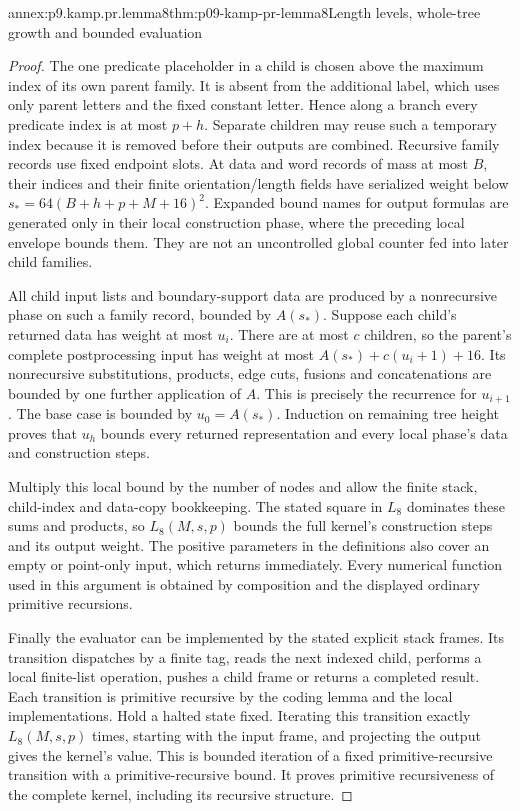 \begin{annexitem}{annex:p9.kamp.pr.lemma8}{thm:p09-kamp-pr-lemma8}{Length levels, whole-tree growth and bounded evaluation}
\begin{proof}
The one predicate placeholder in a child is chosen above the
maximum index of its own parent family. It is absent from the
additional label, which uses only parent letters and the fixed
constant letter. Hence along a branch every predicate index is
at most \(p+h\). Separate children may reuse such a temporary
index because it is removed before their outputs are combined.
Recursive family records use fixed endpoint slots. At data and
word records of mass at most \(B\), their indices and their
finite orientation/length fields have serialized weight below
\(s_*=64(B+h+p+M+16)^2\). Expanded bound names for output
formulas are generated only in their local construction phase,
where the preceding local envelope bounds them. They are not
an uncontrolled global counter fed into later child families.

All child input lists and boundary-support data are produced by
a nonrecursive phase on such a family record, bounded by
\(A(s_*)\). Suppose each child's returned data has weight
at most \(u_i\). There are at most \(c\) children, so
the parent's complete postprocessing input has weight at most
\(A(s_*)+c(u_i+1)+16\). Its nonrecursive substitutions,
products, edge cuts, fusions and concatenations are bounded by
one further application of \(A\). This is precisely the
recurrence for \(u_{i+1}\). The base case is bounded by
\(u_0=A(s_*)\). Induction on remaining tree height proves
that \(u_h\) bounds every returned representation and every
local phase's data and construction steps.

Multiply this local bound by the number of nodes and allow the
finite stack, child-index and data-copy bookkeeping. The stated
square in \(L_8\) dominates these sums and products, so
\(L_8(M,s,p)\) bounds the full kernel's construction steps
and its output weight. The positive parameters in the definitions
also cover an empty or point-only input, which returns immediately.
Every numerical function used in this argument is obtained by
composition and the displayed ordinary primitive recursions.

Finally the evaluator can be implemented by the stated explicit
stack frames. Its transition dispatches by a finite tag, reads
the next indexed child, performs a local finite-list operation,
pushes a child frame or returns a completed result. Each transition
is primitive recursive by the coding lemma and the local implementations.
Hold a halted state fixed. Iterating this transition exactly
\(L_8(M,s,p)\) times, starting with the input frame, and
projecting the output gives the kernel's value. This is bounded
iteration of a fixed primitive-recursive transition with a
primitive-recursive bound. It proves primitive recursiveness of
the complete kernel, including its recursive structure.
\end{proof}
\end{annexitem}

